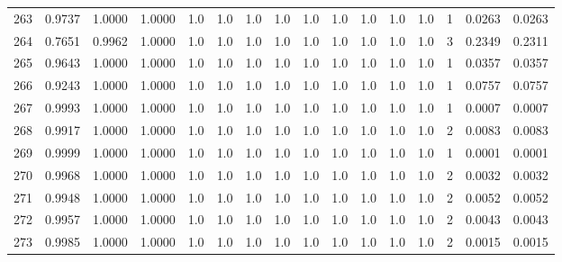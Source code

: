\begin{tabular}{lrrrrrrrrrrrrrrr}
263 &      0.9737 &  1.0000 &  1.0000 &     1.0 &     1.0 &     1.0 &     1.0 &     1.0 &     1.0 &     1.0 &      1.0 &        1.0 &      1 &                    0.0263 &                     0.0263 \\
264 &      0.7651 &  0.9962 &  1.0000 &     1.0 &     1.0 &     1.0 &     1.0 &     1.0 &     1.0 &     1.0 &      1.0 &        1.0 &      3 &                    0.2349 &                     0.2311 \\
265 &      0.9643 &  1.0000 &  1.0000 &     1.0 &     1.0 &     1.0 &     1.0 &     1.0 &     1.0 &     1.0 &      1.0 &        1.0 &      1 &                    0.0357 &                     0.0357 \\
266 &      0.9243 &  1.0000 &  1.0000 &     1.0 &     1.0 &     1.0 &     1.0 &     1.0 &     1.0 &     1.0 &      1.0 &        1.0 &      1 &                    0.0757 &                     0.0757 \\
267 &      0.9993 &  1.0000 &  1.0000 &     1.0 &     1.0 &     1.0 &     1.0 &     1.0 &     1.0 &     1.0 &      1.0 &        1.0 &      1 &                    0.0007 &                     0.0007 \\
268 &      0.9917 &  1.0000 &  1.0000 &     1.0 &     1.0 &     1.0 &     1.0 &     1.0 &     1.0 &     1.0 &      1.0 &        1.0 &      2 &                    0.0083 &                     0.0083 \\
269 &      0.9999 &  1.0000 &  1.0000 &     1.0 &     1.0 &     1.0 &     1.0 &     1.0 &     1.0 &     1.0 &      1.0 &        1.0 &      1 &                    0.0001 &                     0.0001 \\
270 &      0.9968 &  1.0000 &  1.0000 &     1.0 &     1.0 &     1.0 &     1.0 &     1.0 &     1.0 &     1.0 &      1.0 &        1.0 &      2 &                    0.0032 &                     0.0032 \\
271 &      0.9948 &  1.0000 &  1.0000 &     1.0 &     1.0 &     1.0 &     1.0 &     1.0 &     1.0 &     1.0 &      1.0 &        1.0 &      2 &                    0.0052 &                     0.0052 \\
272 &      0.9957 &  1.0000 &  1.0000 &     1.0 &     1.0 &     1.0 &     1.0 &     1.0 &     1.0 &     1.0 &      1.0 &        1.0 &      2 &                    0.0043 &                     0.0043 \\
273 &      0.9985 &  1.0000 &  1.0000 &     1.0 &     1.0 &     1.0 &     1.0 &     1.0 &     1.0 &     1.0 &      1.0 &        1.0 &      2 &                    0.0015 &                     0.0015 \\

\end{tabular}
